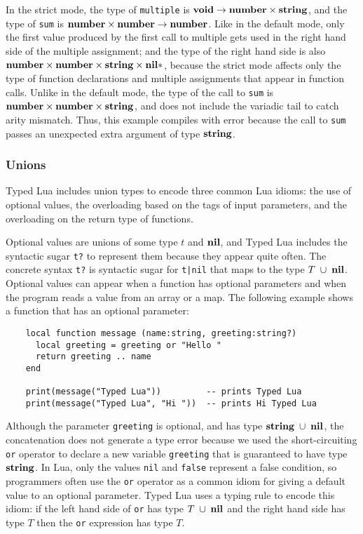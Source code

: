 In the strict mode, the type of \texttt{multiple} is
$\mathbf{void} \rightarrow \mathbf{number} \times \mathbf{string}$,
and the type of \texttt{sum} is $\mathbf{number} \times \mathbf{number} \rightarrow \mathbf{number}$.
Like in the default mode, only the first value produced by the
first call to multiple gets used in the right hand side of the
multiple assignment;
and the type of the right hand side is also
$\mathbf{number} \times \mathbf{number} \times \mathbf{string} \times \mathbf{nil}{*}$,
because the strict mode affects only the type of function declarations
and multiple assignments that appear in function calls.
Unlike in the default mode, the type of the call to \texttt{sum} is
$\mathbf{number} \times \mathbf{number} \times \mathbf{string}$, and does not include the
variadic tail to catch arity mismatch.
Thus, this example compiles with error because the call to \texttt{sum}
passes an unexpected extra argument of type $\mathbf{string}$.

\subsubsection{Unions}

Typed Lua includes union types to encode three common Lua idioms:
the use of optional values, the overloading based on the tags of
input parameters, and the overloading on the return type of functions.

Optional values are unions of some type $t$ and $\mathbf{nil}$, and Typed Lua
includes the syntactic sugar \texttt{t?} to represent them because
they appear quite often.
The concrete syntax \texttt{t?} is syntactic sugar for \texttt{t|nil}
that maps to the type $T\;\cup\;\mathbf{nil}$.
Optional values can appear when a function has optional parameters
and when the program reads a value from an array or a map.
The following example shows a function that has an optional parameter:
\begin{verbatim}
    local function message (name:string, greeting:string?)
      local greeting = greeting or "Hello "
      return greeting .. name
    end

    print(message("Typed Lua"))         -- prints Typed Lua
    print(message("Typed Lua", "Hi "))  -- prints Hi Typed Lua
\end{verbatim}

Although the parameter \texttt{greeting} is optional, and has type
$\mathbf{string}\;\cup\;\mathbf{nil}$, the concatenation does not generate a type error
because we used the short-circuiting \texttt{or} operator to declare a
new variable \texttt{greeting} that is guaranteed to have type $\mathbf{string}$. 
In Lua, only the values \texttt{nil} and \texttt{false} represent a
false condition, so programmers often use the \texttt{or} operator as a
common idiom for giving a default value to an optional parameter. 
Typed Lua uses a typing rule to encode this idiom: 
if the left hand side of \texttt{or} has type $T\;\cup\;\mathbf{nil}$ and
the right hand side has type $T$ then the \texttt{or} expression has
type $T$.

